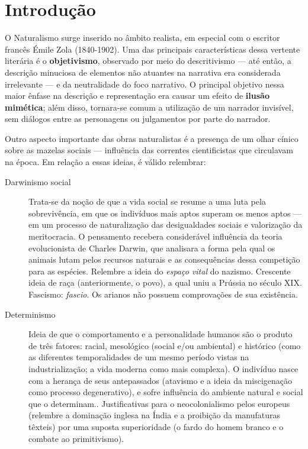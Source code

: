 
\chapter{Introdução}

O Naturalismo surge inserido no âmbito realista, em especial com o escritor francês Émile Zola (1840-1902). Uma das principais características dessa vertente literária é o \textbf{objetivismo}, observado por meio do descritivismo — até então, a descrição minuciosa de elementos não atuantes na narrativa era considerada irrelevante — e da neutralidade do foco narrativo. O principal objetivo nessa maior ênfase na descrição e representação era causar um efeito de \textbf{ilusão mimética}; além disso, tornara-se comum a utilização de um narrador invisível, sem diálogos entre as personagens ou julgamentos por parte do narrador.

Outro aspecto importante das obras naturalistas é a presença de um olhar cínico sobre as mazelas sociais — influência das correntes cientificistas que circulavam na época. Em relação a essas ideias, é válido relembrar:

\begin{description}
    \item[Darwinismo social] Trata-se da noção de que a vida social se resume a uma luta pela sobrevivência, em que os indivíduos mais aptos superam os menos aptos — em um processo de naturalização das desigualdades sociais e valorização da meritocracia. O pensamento recebera considerável influência da teoria evolucionista de Charles Darwin, que analisara a forma pela qual os animais lutam pelos recursos naturais e as consequências dessa competição para as espécies. Relembre a ideia do \textit{espaço vital} do nazismo. Crescente ideia de raça (anteriormente, o povo), a qual uniu a Prússia no século XIX. Fascismo: \textit{fascio}. Os arianos não possuem comprovações de sua existência.
    \item[Determinismo] Ideia de que o comportamento e a personalidade humanos são o produto de três fatores: racial, mesológico (social e/ou ambiental) e histórico (como as diferentes temporalidades de um mesmo período vistas na industrialização; a vida moderna como mais complexa). O indivíduo nasce com a herança de seus antepassados (atavismo e a ideia da miscigenação como processo degenerativo), e sofre influência do ambiente natural e social que o determinam.. Justificativas para o neocolonialismo pelos europeus (relembre a dominação inglesa na Índia e a proibição da manufaturas têxteis) por uma suposta superioridade (o fardo do homem branco e o combate ao primitivismo).
\end{description}

